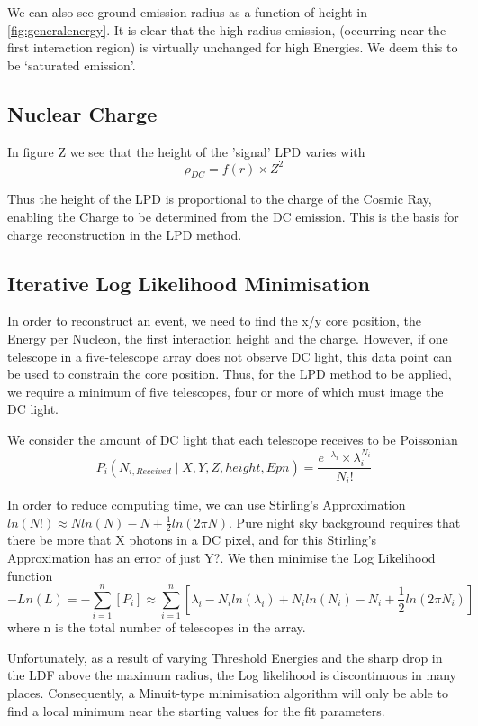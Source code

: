 \documentclass{article}
\begin{document}
We can also see ground emission radius as a function of height in \ref{fig:generalenergy}. It is clear that the high-radius emission, (occurring near the first interaction region) is virtually unchanged for high Energies. We deem this to be \textquoteleft saturated emission\textquoteright.

\subsection{Nuclear Charge}
In figure Z we see that the height of the 'signal' LPD varies with \[ \rho_{DC}  = f(r) \times Z^{2}\]

Thus the height of the LPD is proportional to the charge of the Cosmic Ray, enabling the Charge to be determined from the DC emission. This is the basis for charge reconstruction in the LPD method.

\subsection{Iterative Log Likelihood Minimisation}
In order to reconstruct an event, we need to find the x/y core position, the Energy per Nucleon, the first interaction height and the charge. However, if one telescope in a five-telescope array does not observe DC light, this data point can be used to constrain the core position. Thus, for the LPD method to be applied, we require a minimum of five telescopes, four or more of which must image the DC light.

We consider the amount of DC light that each telescope receives to be Poissonian \[  P_{i} ( N_{i, Received} \mid X, Y, Z, height, Epn )  =  \frac{ e^{- \lambda_{i} } \times \lambda_{i} ^{N_{i}} }{N_{i}!} \]

In order to reduce computing time, we can use Stirling's Approximation $ln( N! )  \approx  N ln(N) - N + \frac{1}{2} ln(2 \pi N)$. Pure night sky background requires that there be more that X photons in a DC pixel, and for this Stirling's Approximation has an error of just Y?. We then minimise the Log Likelihood function \[ - Ln(L) = - \sum_{i=1}^{n} [P_{i}] \approx  \sum_{i=1}^{n} [\lambda _{i} - N_{i} ln(\lambda _{i}) + N_{i} ln(N_{i}) - N_{i} + \frac{1}{2} ln(2 \pi N_{i})]  \]
where n is the total number of telescopes in the array.

Unfortunately, as a result of varying Threshold Energies and the sharp drop in the LDF above the maximum radius, the Log likelihood is discontinuous in many places. Consequently, a Minuit-type minimisation algorithm will only be able to find a local minimum near the starting values for the fit parameters.
\end{document}
